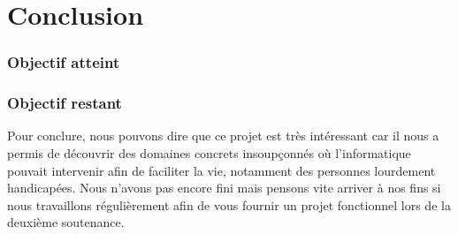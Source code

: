 \part{Conclusion}
	
	\section{Objectif atteint} %
	\label{sec:objectif_atteint}
	
	\section{Objectif restant} %
	\label{sec:objectif_restant}
	
	Pour conclure, nous pouvons dire que ce projet est très intéressant car il nous a permis de découvrir des domaines concrets insoupçonnés où l'informatique pouvait intervenir afin de faciliter la vie, notamment des personnes lourdement handicapées. Nous n'avons pas encore fini mais pensons vite arriver à nos fins si nous travaillons régulièrement afin de vous fournir un projet fonctionnel lors de la deuxième soutenance.
